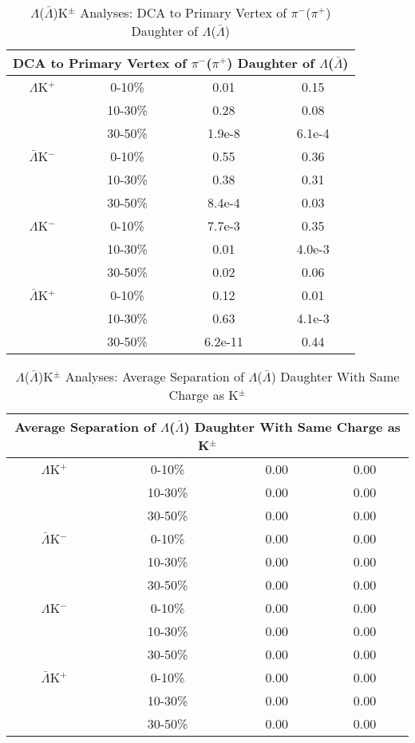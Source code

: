 \documentclass[../AnalysisNoteJBuxton.tex]{subfiles}
\begin{document}
\begin{table}
 \centering
 \begin{tabular}{|c|c|c|c|}
 \multicolumn{4}{c}{DCA to Primary Vertex of $\pi^{-}$($\pi^{+}$) Daughter of $\Lambda$($\bar{\Lambda}$)} \\
  \hline
  $\Lambda$K$^{+}$ & 0-10\% & 0.01 & 0.15 \\
   & 10-30\% & 0.28 & 0.08 \\
   & 30-50\% & 1.9e-8 & 6.1e-4 \\
  \hline
  $\bar{\Lambda}$K$^{-}$ & 0-10\% & 0.55 & 0.36 \\
   & 10-30\% & 0.38 & 0.31 \\
   & 30-50\% & 8.4e-4 & 0.03 \\
  \hline \hline
  $\Lambda$K$^{-}$ & 0-10\% & 7.7e-3 & 0.35 \\
   & 10-30\% & 0.01 & 4.0e-3 \\
   & 30-50\% & 0.02 & 0.06 \\
  \hline
  $\bar{\Lambda}$K$^{+}$ & 0-10\% & 0.12 & 0.01 \\
   & 10-30\% & 0.63 & 4.1e-3 \\
   & 30-50\% & 6.2e-11 & 0.44 \\
  \hline
 \end{tabular}
 \caption{$\Lambda$($\bar{\Lambda}$)K$^{\pm}$ Analyses: DCA to Primary Vertex of $\pi^{-}$($\pi^{+}$) Daughter of $\Lambda$($\bar{\Lambda}$)}
 \label{tab:DcaToPrimVertexPionDaughtOfLamLamKch}
\end{table}


\begin{table}
 \centering
 \begin{tabular}{|c|c|c|c|}
 \multicolumn{4}{c}{Average Separation of $\Lambda$($\bar{\Lambda}$) Daughter With Same Charge as K$^{\pm}$} \\
  \hline
  $\Lambda$K$^{+}$ & 0-10\% & 0.00 & 0.00 \\
   & 10-30\% & 0.00 & 0.00 \\
   & 30-50\% & 0.00 & 0.00 \\
  \hline
  $\bar{\Lambda}$K$^{-}$ & 0-10\% & 0.00 & 0.00 \\
   & 10-30\% & 0.00 & 0.00 \\
   & 30-50\% & 0.00 & 0.00 \\
  \hline \hline
  $\Lambda$K$^{-}$ & 0-10\% & 0.00 & 0.00 \\
   & 10-30\% & 0.00 & 0.00 \\
   & 30-50\% & 0.00 & 0.00 \\
  \hline
  $\bar{\Lambda}$K$^{+}$ & 0-10\% & 0.00 & 0.00 \\
   & 10-30\% & 0.00 & 0.00 \\
   & 30-50\% & 0.00 & 0.00 \\
  \hline
 \end{tabular}
 \caption{$\Lambda$($\bar{\Lambda}$)K$^{\pm}$ Analyses: Average Separation of $\Lambda$($\bar{\Lambda}$) Daughter With Same Charge as K$^{\pm}$}
 \label{tab:minAvgSepTrackPosLamKch}
\end{table}
\end{document}
